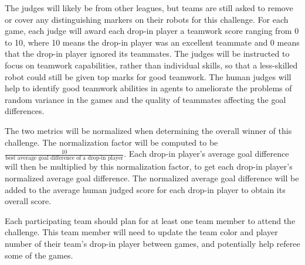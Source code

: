 \documentclass{article}
\begin{document}
The judges will likely be from other leagues, but teams are still asked to remove or cover any distinguishing markers on their robots for this challenge.  For each game, each judge will award each drop-in player a teamwork score ranging from 0 to 10, where 10 means the drop-in player was an excellent teammate and 0 means that the drop-in player ignored its teammates.  The judges will be instructed to focus on teamwork capabilities, rather than individual skills, so that a less-skilled robot could still be given top marks for good teamwork.  The human judges will help to identify good teamwork abilities in agents to ameliorate the problems of random variance in the games and the quality of teammates affecting the goal differences.

The two metrics will be normalized when determining the overall winner of this challenge.  The normalization factor will be computed to be $\frac{10}{\text{best average goal difference of a drop-in player}}$.  Each drop-in player's average goal difference will then be multiplied by this normalization factor, to get each drop-in player's normalized average goal difference.  The normalized average goal difference will be added to the average human judged score for each drop-in player to obtain its overall score.

Each participating team should plan for at least one team member to attend the challenge.  This team member will need to update the team color and player number of their team's drop-in player between games, and potentially help referee some of the games.
\end{document}
